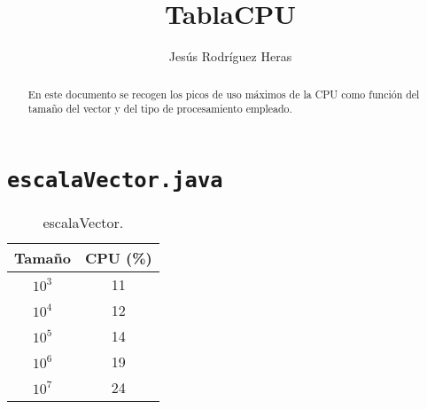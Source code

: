 \documentclass[12pt,letterpaper]{article}
\title{TablaCPU}
\author{Jesús Rodríguez Heras}
\begin{document}
	
	\maketitle
	\begin{abstract} %
		\begin{center}
			En este documento se recogen los picos de uso máximos de la CPU como función del tamaño del vector y del tipo de procesamiento empleado.
		\end{center}
	\end{abstract}
	\thispagestyle{empty}
	\newpage
	
	\tableofcontents
	\newpage
	
	
	
	
	\lstset{language=bash, numbers=left, numberstyle=\tiny, numbersep=10pt, firstnumber=1, stepnumber=1, basicstyle=\small\ttfamily, tabsize=1, extendedchars=true, inputencoding=latin1}


\section{\texttt{escalaVector.java}}

\begin{center}
\begin{table}[htbp]
	\begin{center}
		\begin{tabular}{|c|c|}
			\hline
			\textbf{Tamaño} & \textbf{CPU (\%)}  \\
			\hline 
			$10^3$ & 11 \\ \hline	
			$10^4$ & 12 \\ \hline
			$10^5$ & 14 \\ \hline
			$10^6$ & 19 \\ \hline
			$10^7$ & 24 \\ \hline
		\end{tabular}
		\caption{escalaVector.}
		\label{tabla:escalaVector}
	\end{center}
\end{table}
\end{center}
\end{document}

